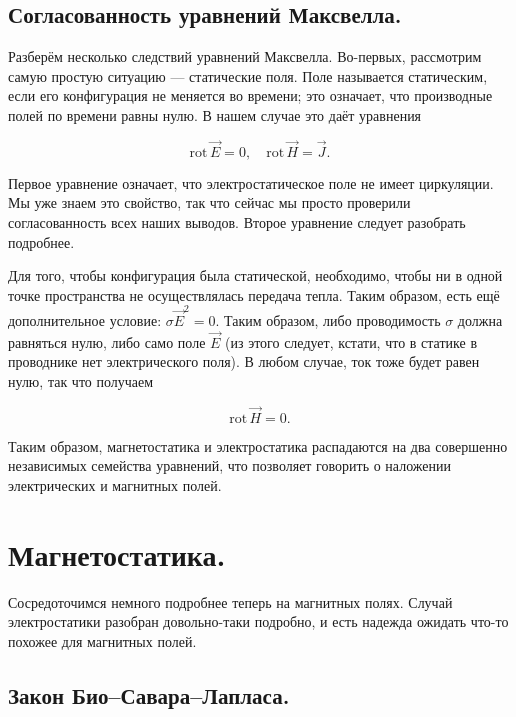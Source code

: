 \documentclass[11pt,a4paper]{article}
\numberwithin{equation}{section}
\newcommand{\rot}{\mathrm{rot}\,}
\begin{document}
\subsection{Согласованность уравнений Максвелла.}
\label{sec:cons_maxwell}

Разберём несколько следствий уравнений Максвелла. Во-первых,
рассмотрим самую простую ситуацию --- статические поля. Поле
называется статическим, если его конфигурация не меняется во времени;
это означает, что производные полей по времени равны нулю. В нашем
случае это даёт уравнения

\begin{equation}
  \label{eq:statics_maxwell_1}
  \rot \vec{E} = 0, \quad \rot \vec{H} = \vec{J}.
\end{equation}

Первое уравнение означает, что электростатическое поле не имеет
циркуляции. Мы уже знаем это свойство, так что сейчас мы просто
проверили согласованность всех наших выводов. Второе уравнение следует
разобрать подробнее. 

Для того, чтобы конфигурация была статической, необходимо, чтобы ни в
одной точке пространства не осуществлялась передача тепла. Таким
образом, есть ещё дополнительное условие: $\sigma \vec{E}^2 =
0$. Таким образом, либо проводимость $\sigma$ должна равняться нулю,
либо само поле $\vec{E}$ (из этого следует, кстати, что в статике в
проводнике нет электрического поля). В любом случае, ток тоже будет
равен нулю, так что получаем

\begin{equation}
  \label{eq:statics_maxwell_2}
  \rot \vec{H} = 0.
\end{equation}

Таким образом, магнетостатика и электростатика распадаются на два
совершенно независимых семейства уравнений, что позволяет говорить о
наложении электрических и магнитных полей. 

\section{Магнетостатика.}
\label{sec:magnetostatics}

Сосредоточимся немного подробнее теперь на магнитных полях. Случай
электростатики разобран довольно-таки подробно, и есть надежда ожидать
что-то похожее для магнитных полей. 

\subsection{Закон Био--Савара--Лапласа.}
\label{sec:biot-savart-laplace}
\end{document}
